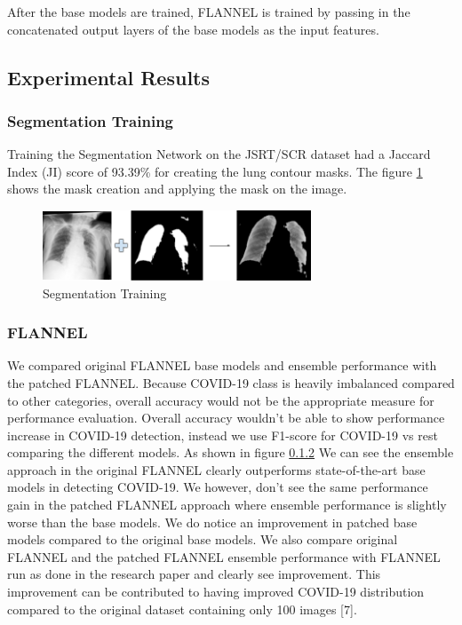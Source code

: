 \documentclass{sigkddExp}
\begin{document}
After the base models are trained, FLANNEL is trained by passing in the
concatenated output layers of the base models as the input features.

\subsection{Experimental Results}
\subsubsection{Segmentation Training}
Training the Segmentation Network on the JSRT/SCR dataset had a Jaccard Index
(JI) score of 93.39\% for creating the lung contour masks. The figure \ref{fig:segtrain}
shows the mask creation and applying the mask on the image.

\begin{figure}[h]
    \includegraphics[width=8cm]{../doc/images/segmentation_training.png}
    \caption{Segmentation Training}
    \label{fig:segtrain}
\end{figure}

\subsubsection{FLANNEL}

We compared original FLANNEL base models and ensemble performance with the
patched FLANNEL. Because COVID-19 class is heavily imbalanced compared to other
categories, overall accuracy would not be the appropriate measure for
performance evaluation. Overall accuracy wouldn’t be able to show performance
increase in COVID-19 detection, instead we use F1-score for COVID-19 vs rest
comparing the different models.  As shown in figure \ref{} We can see the
ensemble approach in the original FLANNEL clearly outperforms state-of-the-art
base models in detecting COVID-19. We however, don’t see the same performance
gain in the patched FLANNEL approach where ensemble performance is slightly
worse than the base models. We do notice an improvement in patched base models
compared to the original base models. We also compare original FLANNEL and the
patched FLANNEL ensemble performance with FLANNEL run as done in the research
paper and clearly see improvement. This improvement can be contributed to having
improved COVID-19 distribution compared to the original dataset containing only
100 images [7].
\end{document}
